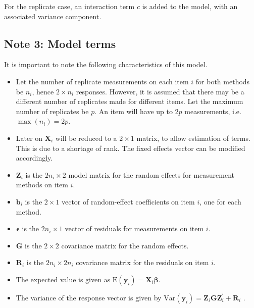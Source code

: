 \documentclass[12pt, a4paper]{report}
\theoremstyle{plain}
\theoremstyle{definition}
\theoremstyle{remark}
\begin{document}
For the replicate case, an interaction term $c$ is added to the model, with an associated variance component.




\subsection{Note 3: Model terms}
It is important to note the following characteristics of this model.
\begin{itemize}
	\item Let the number of replicate measurements on each item $i$ for both methods be $n_i$, hence $2 \times n_i$ responses. However, it is assumed that there may be a different number of replicates made for different items. Let the maximum number of replicates be $p$. An item will have up to $2p$ measurements, i.e. $\max(n_{i}) = 2p$.
	
	
	\item Later on $\boldsymbol{X}_i$ will be reduced to a $2 \times 1$ matrix, to allow estimation of terms. This is due to a shortage of rank. The fixed effects vector can be modified accordingly.
	\item $\boldsymbol{Z}_i$ is the $2n_i \times  2$ model matrix for the random effects for measurement methods on item $i$.
	\item $\boldsymbol{b}_i$ is the $2 \times  1$ vector of random-effect coefficients on item $i$, one for each method.
	\item $\boldsymbol{\epsilon}$  is the $2n_i \times  1$ vector of residuals for measurements on item $i$.
	\item $\boldsymbol{G}$ is the $2 \times  2$ covariance matrix for the random effects.
	\item $\boldsymbol{R}_i$ is the $2n_i \times  2n_i$ covariance matrix for the residuals on item $i$.
	\item The expected value is given as $\mbox{E}(\boldsymbol{y}_i) = \boldsymbol{X}_i\boldsymbol{\beta}.$ \citep{hamlett}
	\item The variance of the response vector is given by $\mbox{Var}(\boldsymbol{y}_i)  = \boldsymbol{Z}_i \boldsymbol{G} \boldsymbol{Z}_i^{\prime} + \boldsymbol{R}_i$ \citep{hamlett}.
\end{itemize}
\newpage
\end{document}
